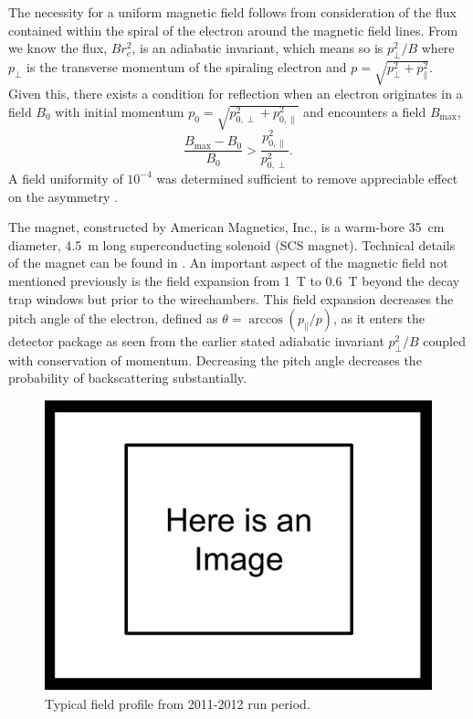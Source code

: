 The necessity for a uniform magnetic field follows from consideration of the flux contained
within the spiral of the electron around the magnetic field lines. From \cite{jackson1999}
we know the flux, $Br_e^2$, is an adiabatic invariant, which means so is $p_\perp^2/B$ where
$p_\perp$ is the transverse momentum of the spiraling electron and $p = \sqrt{p_\perp^2+p_\parallel^2}$.
Given this, there exists a condition for reflection when an electron originates in a field $B_0$
with initial momentum $p_0 = \sqrt{p_{0,\perp}^2+p_{0,\parallel}^2}$
and encounters a field $B_{\mathrm{max}}$,
%
\begin{equation}
  \frac{B_{\mathrm{max}}-B_0}{B_0} > \frac{p^2_{0,\parallel}}{p^2_{0,\perp}}.
  \label{eq:fieldReflection}
\end{equation}
%
A field uniformity of $10^{-4}$ was determined sufficient to remove appreciable effect
on the asymmetry \cite{plaster2008solenoidal}.

The magnet, constructed by American Magnetics, Inc., is a warm-bore 35~cm diameter, 4.5~m
long superconducting solenoid (SCS magnet). Technical details of the magnet can be found in
\cite{plaster2008solenoidal, plaster2012}. An important aspect of the magnetic field not mentioned
previously is the field expansion from 1~T to 0.6~T beyond the decay trap windows but prior to
the wirechambers. This field expansion decreases the pitch angle of the electron,
defined as
$\theta = \arccos(p_{\parallel}/p)$, as it
enters the detector package as seen from the earlier stated adiabatic invariant $p_\perp^2/B$
coupled with conservation of momentum. Decreasing the pitch angle decreases the probability
of backscattering substantially.

\begin{figure}[h]
  \centering
  \includegraphics[scale=0.38]{2-UCNAExperiment/ImageHolder.pdf} 
  \caption{Typical field profile from 2011-2012 run period.}
  \label{fig:field_profile}
\end{figure}

